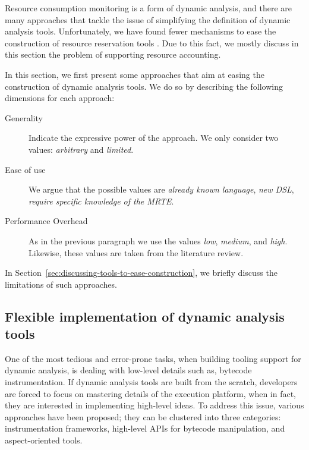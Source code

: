 Resource consumption monitoring is a form of dynamic analysis, and there are many approaches that tackle the issue of simplifying the definition of dynamic analysis tools.
Unfortunately, we have found fewer mechanisms to ease the construction of resource reservation tools \cite{mueller}.
Due to this fact, we mostly discuss in this section the problem of supporting resource accounting. 

In this section, we first present some approaches that aim at easing the construction of dynamic analysis tools.
We do so by describing the following dimensions for each approach:

\begin{description}
\item[Generality] Indicate the expressive power of the approach. We only consider two values: \textit{arbitrary} and \textit{limited}.

\item[Ease of use] We argue that the possible values are \textit{already known language}, \textit{new DSL}, \textit{require specific knowledge of the MRTE}.

\item[Performance Overhead] As in the previous paragraph we use the values \textit{low}, \textit{medium}, and \textit{high}.
Likewise, these values are taken from the literature review.
\end{description}

In Section~\ref{sec:discussing-tools-to-ease-construction}, we briefly discuss the limitations of such approaches.


\subsection{Flexible implementation of dynamic analysis tools}

One of the most tedious and error-prone tasks, when building tooling support for dynamic analysis, is dealing with low-level details such as, bytecode instrumentation.
If dynamic analysis tools are built from the scratch, developers are forced to focus on mastering details of the execution platform, when in fact, they are interested in implementing high-level ideas.
To address this issue, various approaches have been proposed; they can be clustered into three categories: instrumentation frameworks, high-level APIs for bytecode manipulation, and aspect-oriented tools.

